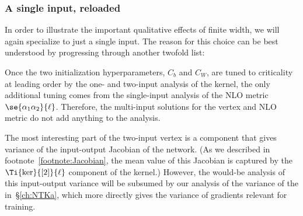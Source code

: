 \subsubsection{A single input, reloaded}
In order to illustrate the important qualitative effects of finite width, we will again specialize to just a single input. 
The reason for this choice can be best understood by progressing through another twofold list: 
\bi
\item[\emph{(i)}] Once the two initialization hyperparameters, $C_b$ and $C_W$, are tuned to criticality at leading order by the one- and two-input analysis of the kernel, the only additional tuning comes from the single-input analysis of the NLO metric $\se{\alpha_1\alpha_2}{\ell}$. Therefore, the multi-input solutions for the vertex and NLO metric do not add anything to the  analysis.
\item[\emph{(ii)}]
The most interesting part of the two-input vertex is a component that gives variance of the input-output Jacobian of the network. (As we described in footnote~\ref{footnote:Jacobian}, the mean value of this Jacobian is captured by 
the $\Ti{\ker}{[2]}{\ell}$ component of the kernel.) However, the would-be analysis of this input-output variance will be subsumed by our analysis of the variance of the  in~\S\ref{ch:NTKa}, which more directly gives the variance of gradients relevant for training.
\ei 



